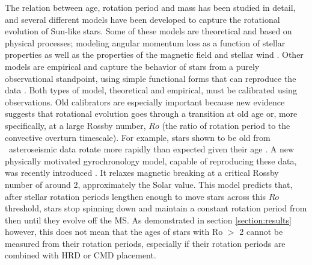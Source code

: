 The relation between age, rotation period and mass has been studied in detail,
and several different models have been developed to capture the rotational
evolution of Sun-like stars.
Some of these models are theoretical and based on physical processes; modeling
angular momentum loss as a function of stellar properties as well as the
properties of the magnetic field and stellar wind \citep[\eg][]{kawaler1988,
kawaler1989, vansaders2013, matt2015, vansaders2016}.
Other models are empirical and capture the behavior of stars from a purely
observational standpoint, using simple functional forms that can reproduce the
data \citep[\eg][]{barnes2003, barnes2007, mamajek2008, angus2015}.
Both types of model, theoretical and empirical, must be calibrated using
observations.
Old calibrators are especially important because new evidence suggests that
rotational evolution goes through a transition at old age or, more
specifically, at a large Rossby number, $Ro$ (the ratio of rotation period to
the convective overturn timescale).
For example, stars shown to be old from \kepler\ asteroseismic data rotate
more rapidly than expected given their age \citep{angus2015, vansaders2016}.
A new physically motivated gyrochronology model, capable of reproducing these
data, was recently introduced \citep{vansaders2016}.
It relaxes magnetic breaking at a critical Rossby number of around 2,
approximately the Solar value.
This model predicts that, after stellar rotation periods lengthen enough to
move stars across this $Ro$ threshold, stars stop spinning down and maintain a
constant rotation period from then until they evolve off the MS.
As demonstrated in section \ref{section:results} however, this does not mean
that the ages of stars with Ro $>$ 2 cannot be measured from their rotation
periods, especially if their rotation periods are combined with HRD or CMD
placement.

